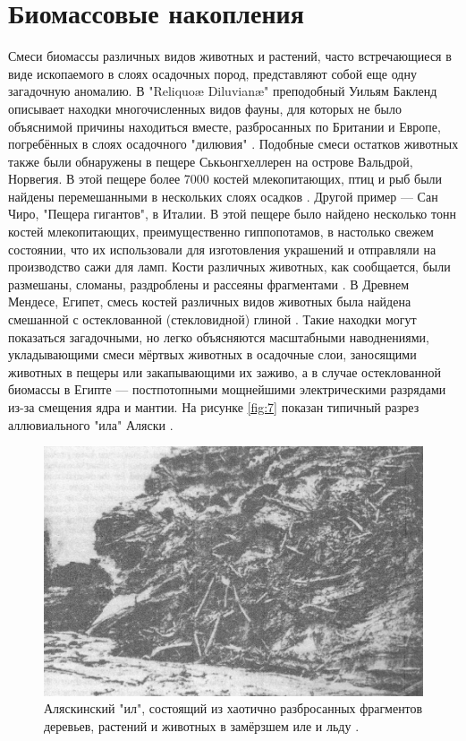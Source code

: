 \documentclass[10pt,twocolumn,letterpaper]{article}
\begin{document}
\section{Биомассовые накопления}

Смеси биомассы различных видов животных и растений, часто встречающиеся в виде ископаемого в слоях осадочных пород, представляют собой еще одну загадочную аномалию. В "Reliquoæ Diluvianæ" преподобный Уильям Бакленд описывает находки многочисленных видов фауны, для которых не было объяснимой причины находиться вместе, разбросанных по Британии и Европе, погребённых в слоях осадочного "дилювия" \cite{58}. Подобные смеси остатков животных также были обнаружены в пещере Ськьонгхеллерен на острове Вальдрой, Норвегия. В этой пещере более 7000 костей млекопитающих, птиц и рыб были найдены перемешанными в нескольких слоях осадков \cite{59}. Другой пример — Сан Чиро, "Пещера гигантов", в Италии. В этой пещере было найдено несколько тонн костей млекопитающих, преимущественно гиппопотамов, в настолько свежем состоянии, что их использовали для изготовления украшений и отправляли на производство сажи для ламп. Кости различных животных, как сообщается, были размешаны, сломаны, раздроблены и рассеяны фрагментами \cite{60,61}. В Древнем Мендесе, Египет, смесь костей различных видов животных была найдена смешанной с остеклованной (стекловидной) глиной \cite{57}. Такие находки могут показаться загадочными, но легко объясняются масштабными наводнениями, укладывающими смеси мёртвых животных в осадочные слои, заносящими животных в пещеры или закапывающими их заживо, а в случае остеклованной биомассы в Египте — постпотопными мощнейшими электрическими разрядами из-за смещения ядра и мантии. На рисунке \ref{fig:7} показан типичный разрез аллювиального "ила" Аляски \cite{56}.

\begin{figure}[t]
\begin{center}
   \includegraphics[width=1\linewidth]{muck-crop.jpeg}
\end{center}
   \caption{Аляскинский "ил", состоящий из хаотично разбросанных фрагментов деревьев, растений и животных в замёрзшем иле и льду \cite{146}.}
\label{fig:7}
\label{fig:onecol}
\end{figure}
\end{document}
